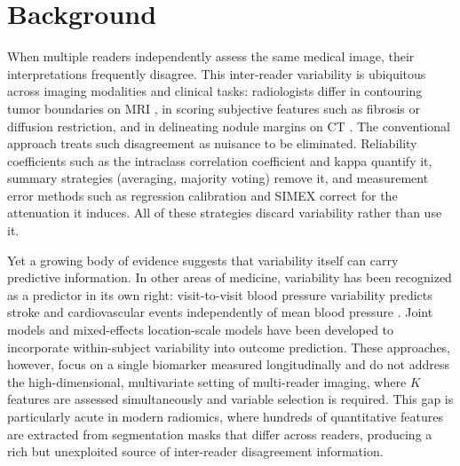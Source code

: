 \documentclass[referee,lineno,pdflatex,sn-vancouver-num]{sn-jnl}
\begin{document}

\maketitle

\section{Background}\label{sec:background}

When multiple readers independently assess the same medical image, their interpretations frequently disagree.
This inter-reader variability is ubiquitous across imaging modalities and clinical tasks: radiologists differ in contouring tumor boundaries on MRI \cite{BeetsTan2018,MERCURY2006}, in scoring subjective features such as fibrosis or diffusion restriction, and in delineating nodule margins on CT \cite{Armato2011}.
The conventional approach treats such disagreement as nuisance to be eliminated.
Reliability coefficients such as the intraclass correlation coefficient \cite{Shrout1979} and kappa \cite{Fleiss1971} quantify it, summary strategies (averaging, majority voting) remove it, and measurement error methods such as regression calibration and SIMEX \cite{Carroll2006,Cook1994} correct for the attenuation it induces.
All of these strategies discard variability rather than use it.

Yet a growing body of evidence suggests that variability itself can carry predictive information.
In other areas of medicine, variability has been recognized as a predictor in its own right: visit-to-visit blood pressure variability predicts stroke and cardiovascular events independently of mean blood pressure \cite{Rothwell2010,Diaz2014}.
Joint models \cite{Gao2022,Yu2024} and mixed-effects location-scale models \cite{Hedeker2008} have been developed to incorporate within-subject variability into outcome prediction.
These approaches, however, focus on a single biomarker measured longitudinally and do not address the high-dimensional, multivariate setting of multi-reader imaging, where $K$ features are assessed simultaneously and variable selection is required.
This gap is particularly acute in modern radiomics, where hundreds of quantitative features are extracted from segmentation masks that differ across readers, producing a rich but unexploited source of inter-reader disagreement information.
\end{document}
